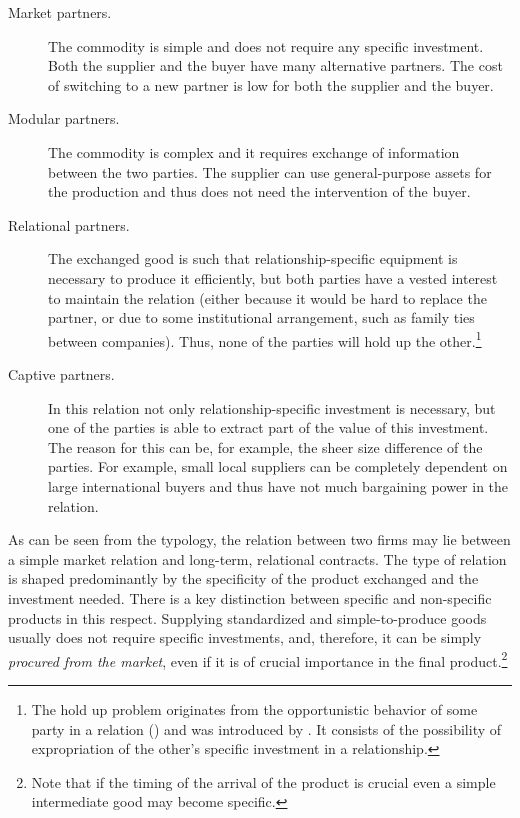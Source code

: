 \documentclass[final, dvipsnames, authoryear,12pt]{elsarticle}
\begin{document}
\begin{description}
    \item[Market partners.] The commodity is simple and does not require any specific investment. Both the supplier and the buyer have many alternative partners. The cost of switching to a new partner is low for both the supplier and the buyer.
    \item[Modular partners.] The commodity is complex and it requires exchange of information between the two parties. The supplier can use general-purpose assets for the production and thus does not need the intervention of the buyer.
    \item[Relational partners.] The exchanged good is such that relationship-specific equipment is necessary to produce it efficiently, but both parties have a vested interest to maintain the relation (either because it would be hard to replace the partner, or due to some institutional arrangement, such as family ties between companies). Thus, none of the parties will hold up the other.\footnote{The hold up problem originates from the opportunistic behavior of some party in a relation (\cite{williamson2007economic}) and was introduced by \cite{grossman1986costs}. It consists of the possibility of expropriation of the other's specific investment in a relationship.}
    \item[Captive partners.] In this relation not only relationship-specific investment is necessary, but one of the parties is able to extract part of the value of this investment. The reason for this can be, for example, the sheer size difference of the parties. For example, small local suppliers can be completely dependent on large international buyers and thus have not much bargaining power in the relation.
\end{description}

As can be seen from the typology, the relation between two firms may lie between a simple market relation and long-term, relational contracts. The type of relation is shaped predominantly by the specificity of the product exchanged and the investment needed. There is a key distinction between specific and non-specific products in this respect. Supplying standardized and simple-to-produce goods usually does not require specific investments, and, therefore, it can be simply \textit{procured from the market}, even if it is of crucial importance in the final product.\footnote{Note that if the timing of the arrival of the product is crucial even a simple intermediate good may become specific.} 
\end{document}

